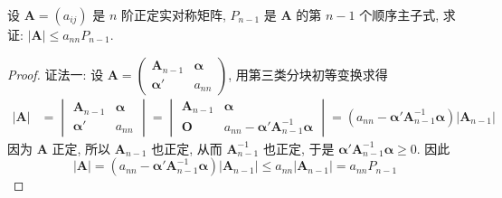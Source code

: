 \documentclass[../../main.tex]{subfiles}%
\begin{document}
\begin{proposition}\label{proposition:关于正定阵的行列式的不等式}
设 \(\boldsymbol{A}=(a_{ij})\) 是 \(n\) 阶正定实对称矩阵, \(P_{n - 1}\) 是 \(\boldsymbol{A}\) 的第 \(n - 1\) 个顺序主子式, 求证: \(|\boldsymbol{A}|\leqslant  a_{nn}P_{n - 1}\).
\end{proposition}
\begin{proof}

{\color{blue}证法一:}
设 \(\boldsymbol{A}=\begin{pmatrix}\boldsymbol{A}_{n - 1}&\boldsymbol{\alpha}\\\boldsymbol{\alpha}'&a_{nn}\end{pmatrix}\), 用第三类分块初等变换求得
\begin{align*}
|\boldsymbol{A}|&=\begin{vmatrix}\boldsymbol{A}_{n - 1}&\boldsymbol{\alpha}\\\boldsymbol{\alpha}'&a_{nn}\end{vmatrix}=\begin{vmatrix}\boldsymbol{A}_{n - 1}&\boldsymbol{\alpha}\\\boldsymbol{O}&a_{nn}-\boldsymbol{\alpha}'\boldsymbol{A}_{n - 1}^{-1}\boldsymbol{\alpha}\end{vmatrix}=(a_{nn}-\boldsymbol{\alpha}'\boldsymbol{A}_{n - 1}^{-1}\boldsymbol{\alpha})|\boldsymbol{A}_{n - 1}|
\end{align*}
因为 \(\boldsymbol{A}\) 正定, 所以 \(\boldsymbol{A}_{n - 1}\) 也正定, 从而 \(\boldsymbol{A}_{n - 1}^{-1}\) 也正定, 于是 \(\boldsymbol{\alpha}'\boldsymbol{A}_{n - 1}^{-1}\boldsymbol{\alpha}\geqslant 0\). 因此
\[|\boldsymbol{A}|=(a_{nn}-\boldsymbol{\alpha}'\boldsymbol{A}_{n - 1}^{-1}\boldsymbol{\alpha})|\boldsymbol{A}_{n - 1}|\leqslant  a_{nn}|\boldsymbol{A}_{n - 1}|=a_{nn}P_{n - 1}\]


\end{proof}
\end{document}
